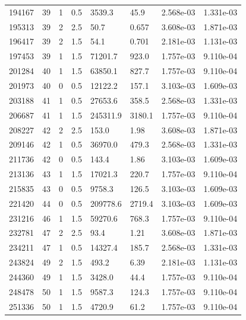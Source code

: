 \documentclass[preview]{standalone}
\begin{document}
{{{\begin{tabular}{L{1.2cm}C{1.2cm} C{0.3cm}C{0.5cm} C{1.4cm}C{1.4cm} C{1.4cm}C{1.4cm}}
  194167  &    39  & 1     & 0.5 &  3539.3  & 45.9  & 2.568e-03 &  1.331e-03   \\ 
  195313  &    39  & 2     & 2.5 &  50.7  & 0.657  & 3.608e-03 &  1.871e-03   \\ 
  196417  &    39  & 2     & 1.5 &  54.1  & 0.701  & 2.181e-03 &  1.131e-03   \\ 
  197453  &    39  & 1     & 1.5 &  71201.7  & 923.0  & 1.757e-03 &  9.110e-04   \\ 
  201284  &    40  & 1     & 1.5 &  63850.1  & 827.7  & 1.757e-03 &  9.110e-04   \\ 
  201973  &    40  & 0     & 0.5 &  12122.2  & 157.1  & 3.103e-03 &  1.609e-03   \\ 
  203188  &    41  & 1     & 0.5 &  27653.6  & 358.5  & 2.568e-03 &  1.331e-03   \\ 
  206687  &    41  & 1     & 1.5 &  245311.9  & 3180.1  & 1.757e-03 &  9.110e-04   \\ 
  208227  &    42  & 2     & 2.5 &  153.0  & 1.98  & 3.608e-03 &  1.871e-03   \\ 
  209146  &    42  & 1     & 0.5 &  36970.0  & 479.3  & 2.568e-03 &  1.331e-03   \\ 
  211736  &    42  & 0     & 0.5 &  143.4  & 1.86  & 3.103e-03 &  1.609e-03   \\ 
  213136  &    43  & 1     & 1.5 &  17021.3  & 220.7  & 1.757e-03 &  9.110e-04   \\ 
  215835  &    43  & 0     & 0.5 &  9758.3  & 126.5  & 3.103e-03 &  1.609e-03   \\ 
  221420  &    44  & 0     & 0.5 &  209778.6  & 2719.4  & 3.103e-03 &  1.609e-03   \\ 
  231216  &    46  & 1     & 1.5 &  59270.6  & 768.3  & 1.757e-03 &  9.110e-04   \\ 
  232781  &    47  & 2     & 2.5 &  93.4  & 1.21  & 3.608e-03 &  1.871e-03   \\ 
  234211  &    47  & 1     & 0.5 &  14327.4  & 185.7  & 2.568e-03 &  1.331e-03   \\ 
  243824  &    49  & 2     & 1.5 &  493.2  & 6.39  & 2.181e-03 &  1.131e-03   \\ 
  244360  &    49  & 1     & 1.5 &  3428.0  & 44.4  & 1.757e-03 &  9.110e-04   \\ 
  248478  &    50  & 1     & 1.5 &  9587.3  & 124.3  & 1.757e-03 &  9.110e-04   \\ 
  251336  &    50  & 1     & 1.5 &  4720.9  & 61.2  & 1.757e-03 &  9.110e-04   \\ 

\end{tabular}}}}
\end{document}
